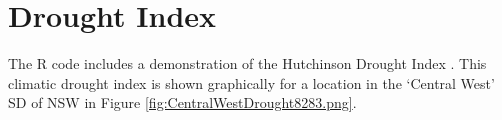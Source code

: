 \documentclass[a4paper]{article}                %
\begin{document}





\section{Drought Index}

        The R code includes a demonstration of the Hutchinson Drought Index \cite{Smith1992}.  This climatic drought index is shown graphically for a location in the `Central West' SD of NSW in Figure \ref{fig:CentralWestDrought8283.png}.










\end{document}
